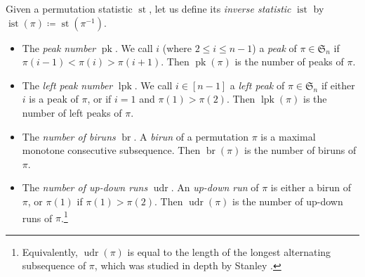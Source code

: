\DeclareMathOperator{\pk}{pk}
\DeclareMathOperator{\ipk}{ipk}
\DeclareMathOperator{\lpk}{lpk}
\DeclareMathOperator{\ilpk}{ilpk}
\DeclareMathOperator{\br}{br}
\DeclareMathOperator{\ibr}{ibr}
\DeclareMathOperator{\udr}{udr}
\DeclareMathOperator{\iudr}{iudr}
\DeclareMathOperator{\st}{st}
\DeclareMathOperator{\ist}{ist}

Given a permutation statistic $\st$, let us define its \textit{inverse
statistic} $\ist$ by $\ist(\pi)\coloneqq\st(\pi^{-1})$.

\begin{itemize}
\item The \textit{peak number} $\pk$. We call $i$ (where $2\leq i\leq n-1$)
a \textit{peak} of $\pi\in\mathfrak{S}_{n}$ if $\pi(i-1)<\pi(i)>\pi(i+1)$.
Then $\pk(\pi)$ is the number of peaks of $\pi$.
\item The \textit{left peak number} $\lpk$. We call $i\in[n-1]$ a \textit{left
peak} of $\pi\in\mathfrak{S}_{n}$ if either $i$ is a peak of $\pi$,
or if $i=1$ and $\pi(1)>\pi(2)$. Then $\lpk(\pi)$ is the number
of left peaks of $\pi$.
\item The \textit{number of biruns} $\br$. A \textit{birun} of a permutation
$\pi$ is a maximal monotone consecutive subsequence. Then $\br(\pi)$
is the number of biruns of $\pi$.
\item The \textit{number of up-down runs} $\udr$. An \textit{up-down run}
of $\pi$ is either a birun of $\pi$, or $\pi(1)$ if $\pi(1)>\pi(2)$.
Then $\udr(\pi)$ is the number of up-down runs of $\pi$.\footnote{Equivalently, $\udr(\pi)$ is equal to the length of the longest alternating
subsequence of $\pi$, which was studied in depth by Stanley \cite{Stanley2008}.}
\end{itemize}
